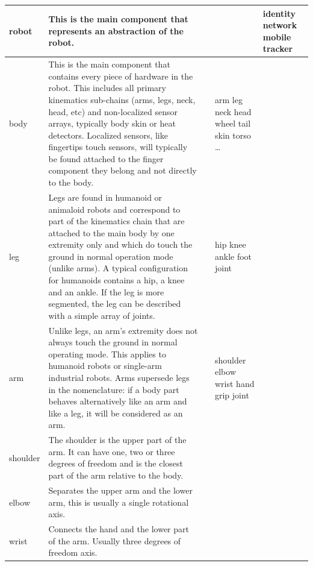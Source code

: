 \begin{center}
\begin{supertabular}{|m{2.312cm}|m{6.776cm}|m{2.629cm}|m{2.471cm}|m{2.1269999cm}|}
robot &
This is the main component that
represents an abstraction of the robot. &
\code{{}-} &
 &
\ttfamily identity network mobile
tracker\\\hline
body &
This is the main component that
contains every piece of hardware in the robot. This includes all
primary kinematics sub-chains (arms, legs, neck, head, etc) and
non-localized sensor arrays, typically body skin or heat detectors.
Localized sensors, like fingertips touch sensors, will typically be
found attached to the finger component they belong and not directly to
the body.  &
 &
\ttfamily arm leg neck head wheel tail skin
torso … &
\code{{}-} \\\hline
leg &
Legs are found in humanoid or
animaloid robots and correspond to part of the kinematics chain that
are attached to the main body by one extremity only and which do touch
the ground in normal operation mode (unlike arms). A typical
configuration for humanoids contains a hip, a knee and an ankle. If the
leg is more segmented, the leg can be described with a simple array of
joints. &
 &
hip knee ankle foot joint &
\code{{}-} \\\hline
arm &
Unlike legs, an arm’s extremity does
not always touch the ground in normal operating mode. This applies to
humanoid robots or single-arm industrial robots. Arms supersede legs in
the nomenclature: if a body part behaves alternatively like an arm and
like a leg, it will be considered as an arm. &
 &
shoulder elbow wrist hand grip  joint &
\code{{}-} \\\hline
shoulder &
The shoulder is the upper part of the
arm. It can have one, two or three degrees of freedom and is the
closest part of the arm relative to the body. &
 &
 &
\code{{}-} \\\hline
elbow &
Separates the upper arm and the lower
arm, this is usually a single rotational axis. &
 &
 &
\code{{}-} \\\hline
wrist &
Connects the hand and the lower part
of the arm. Usually three degrees of freedom axis. &
 &
 &
\code{{}-} \\\hline

\end{supertabular}
\end{center}

